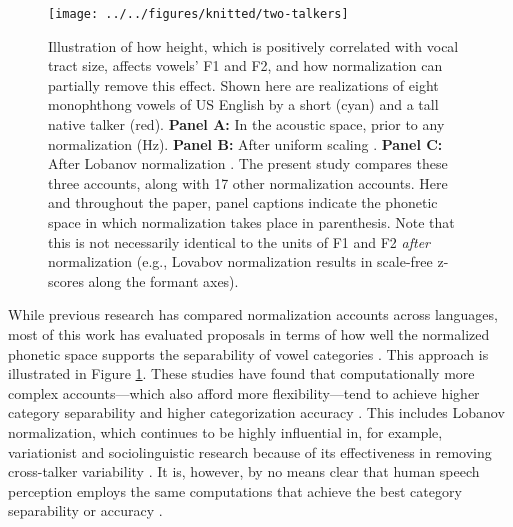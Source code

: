 \documentclass[preprint]{JASA}
\begin{document}
\begin{figure}

{\centering \texttt{[image: ../../figures/knitted/two-talkers]} 

}

\caption{Illustration of how height, which is positively correlated with vocal tract size, affects vowels' F1 and F2, and how normalization can partially remove this effect. Shown here are realizations of eight monophthong vowels of US English by a short (cyan) and a tall native talker (red). \textbf{Panel A:} In the acoustic space, prior to any normalization (Hz). \textbf{Panel B:} After uniform scaling \citep{nearey1978}. \textbf{Panel C:} After Lobanov normalization \citep{lobanov1971}. The present study compares these three accounts, along with 17 other normalization accounts. Here and throughout the paper, panel captions indicate the phonetic space in which normalization takes place in parenthesis. Note that this is not necessarily identical to the units of F1 and F2 \emph{after} normalization (e.g., Lovabov normalization results in scale-free z-scores along the formant axes).}\label{fig:two-talkers}
\end{figure}

While previous research has compared normalization accounts across languages, most of this work has evaluated proposals in terms of how well the normalized phonetic space supports the separability of vowel categories \citep{adank2004, carpenter-govindarajan1993, cole2010, escudero-bion2007, johnson-sjerps2021, syrdal1985}. This approach is illustrated in Figure \ref{fig:two-talkers}. These studies have found that computationally more complex accounts---which also afford more flexibility---tend to achieve higher category separability and higher categorization accuracy \citep[for review, see][]{persson-jaeger2023}. This includes Lobanov normalization, which continues to be highly influential in, for example, variationist and sociolinguistic research because of its effectiveness in removing cross-talker variability \citep[for a critique, see][]{barreda2021}. It is, however, by no means clear that human speech perception employs the same computations that achieve the best category separability or accuracy \citep[see also discussion in][]{barreda2021, nearey-assmann2007}.
\end{document}
